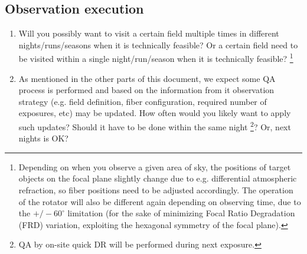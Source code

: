 \documentclass[a4paper,notitlepage]{article}
\begin{document}
%
%

\subsection{Observation execution}

\begin{enumerate}
  \item[\cols{a}] Will you possibly want to visit a certain field
           multiple times in different nights/runs/seasons when it
           is technically feasible?
           Or a certain field need to be visited within a single 
           night/run/season when it is technically feasible? 
           \footnote{Depending on when you
           observe a given area of sky, the positions of target
           objects on the focal plane slightly change due to
           e.g. differential atmospheric refraction, so fiber
           positions need to be adjusted accordingly. The operation
           of the rotator will also be different again depending on
           observing time, due to the $+/-60^{\circ}$ limitation
           (for the sake of minimizing Focal Ratio Degradation (FRD)
           variation, exploiting the hexagonal symmetry of the focal
           plane).}
  \item[\cols{b}] As mentioned in the other parts of this document, we
           expect some QA process is performed and based on the
           information from it observation strategy (e.g. field
           definition, fiber configuration, required number of
           exposures, etc) may be updated. How often would you
           likely want to apply such updates? Should it have to be done
           within the same night \footnote{QA by on-site quick DR will
       be performed during next exposure.}? Or, next nights is OK?
\end{enumerate}
\end{document}
